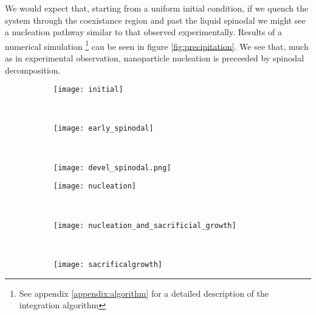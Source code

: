 We would expect that, starting from a uniform initial condition, if we quench
the system through the coexistance region and past the liquid spinodal we
might see a nucleation pathway similar to that observed experimentally. Results
of a numerical simulation \footnote{See appendix \ref{appendix:algorithm} for a
detailed description of the integration algorithm} can be seen in figure
\ref{fig:precipitation}. We see that, much as in experimental observation,
nanoparticle nucleation is preceeded by spinodal decomposition.

\begin{figure}
    \centering
    \begin{subfigure}[b]{0.3\textwidth}
        \texttt{[image: initial]}
        \label{fig:initial}
        \caption{}
    \end{subfigure}
    ~
    \begin{subfigure}[b]{0.3\textwidth}
        \texttt{[image: early\_spinodal]}
        \label{fig:early_spinodal}
        \caption{}
    \end{subfigure}
    ~
    \begin{subfigure}[b]{0.3\textwidth}
        \texttt{[image: devel\_spinodal.png]}
        \label{fig:devel_spinodal}
        \caption{}
    \end{subfigure}

    \vspace{0.25cm}
    \begin{subfigure}[b]{0.3\textwidth}
        \texttt{[image: nucleation]}
        \label{fig:nucleation}
        \caption{}
    \end{subfigure}
    ~
    \begin{subfigure}[b]{0.3\textwidth}
        \texttt{[image: nucleation\_and\_sacrificial\_growth]}
        \label{fig:nucleation_and_growth}
        \caption{} 
    \end{subfigure}
    ~
    \begin{subfigure}[b]{0.3\textwidth}
        \texttt{[image: sacrificalgrowth]}
        \label{fig:sacrifical_growth}
        \caption{}
    \end{subfigure}
    

\end{figure}
